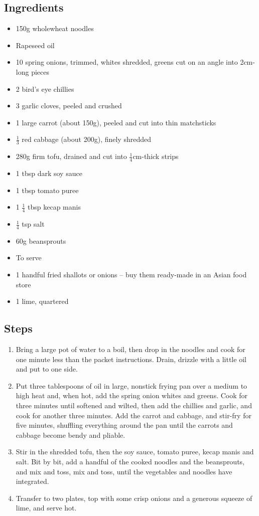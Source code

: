 \documentclass{book}
\begin{document}
\subsection*{Ingredients}
\begin{itemize}
\item 150g wholewheat noodles
\item Rapeseed oil
\item 10 spring onions, trimmed, whites shredded, greens cut on an angle into 2cm-long pieces
\item 2 bird’s eye chillies
\item 3 garlic cloves, peeled and crushed
\item 1 large carrot (about 150g), peeled and cut into thin matchsticks
\item $\frac{1}{3}$ red cabbage (about 200g), finely shredded
\item 280g firm tofu, drained and cut into $\frac{1}{4}$cm-thick strips
\item 1 tbsp dark soy sauce
\item 1 tbsp tomato puree
\item 1 $\frac{1}{4}$ tbsp kecap manis
\item $\frac{1}{4}$ tsp salt
\item 60g beansprouts
\end{itemize}

\begin{itemize}
\item To serve
\item 1 handful fried shallots or onions – buy them ready-made in an Asian food store
\item 1 lime, quartered
\end{itemize}

\subsection*{Steps}
\begin{enumerate}
\item Bring a large pot of water to a boil, then drop in the noodles and cook for one minute less than the packet instructions. Drain, drizzle with a little oil and put to one side.
\item Put three tablespoons of oil in large, nonstick frying pan over a medium to high heat and, when hot, add the spring onion whites and greens. Cook for three minutes until softened and wilted, then add the chillies and garlic, and cook for another three minutes. Add the carrot and cabbage, and stir-fry for five minutes, shuffling everything around the pan until the carrots and cabbage become bendy and pliable.
\item Stir in the shredded tofu, then the soy sauce, tomato puree, kecap manis and salt. Bit by bit, add a handful of the cooked noodles and the beansprouts, and mix and toss, mix and toss, until the vegetables and noodles have integrated.
\item Transfer to two plates, top with some crisp onions and a generous squeeze of lime, and serve hot.
\end{enumerate}
\newpage
\end{document}
